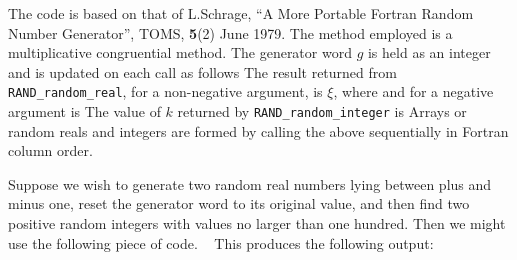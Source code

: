 \documentclass{galahad}
\newcommand{\packagename}{RAND}
\begin{document}
\galmethod
The code is based on that of L.Schrage, ``A More
 Portable Fortran Random Number Generator'', TOMS, {\bf 5}(2) June 1979.
 The method employed is a multiplicative congruential method. The
 generator word $g$ is held as an integer and is updated on each call
 as follows
 The result returned from {\tt \packagename\_random\_real},
 for a non-negative argument, is $\xi$, where
 and for a negative argument is
 The value of $k$ returned by {\tt \packagename\_random\_integer} is
Arrays or random reals and integers are formed by calling the above
sequentially in Fortran column order.


\galexample
Suppose we wish to generate two random real numbers lying between plus
and minus one, reset the generator word to its original value, and then
find two positive random integers with values no larger than one hundred.
Then we might use the following piece of code.
{\tt \small
\VerbatimInput{\packageexample}
}
This produces the following output:
{\tt \small
\VerbatimInput{\packageresults}
}
\end{document}
